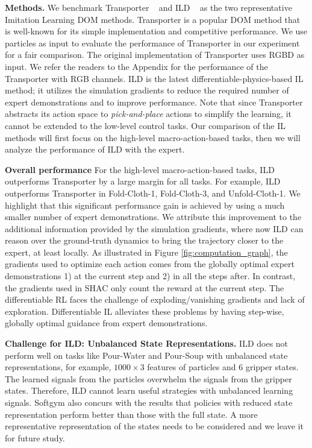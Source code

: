 

\textbf{Methods.}
We benchmark Transporter ~\citep{transporter} and ILD ~\citep{ILD} as the two representative Imitation Learning DOM methods. Transporter is a popular DOM method that is well-known for its simple implementation and competitive performance. We use particles as input to evaluate the performance of Transporter in our experiment for a fair comparison. The original implementation of Transporter uses RGBD as input. We refer the readers to the Appendix  for the performance of the Transporter with RGB channels. ILD is the latest differentiable-physics-based IL method; it utilizes the simulation gradients to reduce the required number of expert demonstrations and to improve performance. Note that since Transporter abstracts its action space to \textit{pick-and-place} actions to simplify the learning, it cannot be extended to the low-level control tasks. Our comparison of the IL methods will first focus on the high-level macro-action-based tasks, then we will analyze the performance of ILD with the expert.

\textbf{Overall performance} For the high-level macro-action-based tasks, ILD outperforms Transporter by a large margin for all tasks. For example, ILD outperforms Transporter in Fold-Cloth-1, Fold-Cloth-3, and Unfold-Cloth-1. We highlight that this significant performance gain is achieved by using a much smaller number of expert demonstrations. We attribute this improvement to the additional information provided by the simulation gradients, where now ILD can reason over the ground-truth dynamics to bring the trajectory closer to the expert, at least locally. As illustrated in Figure \ref{fig:computation_graph}, the gradients used to optimize each action comes from the globally optimal expert demonstrations 1) at the current step and 2) in all the steps after. In contrast, the gradients used in SHAC only count the reward at the current step. The differentiable RL faces the challenge of exploding/vanishing gradients and lack of exploration. Differentiable IL alleviates these problems by having step-wise, globally optimal guidance from expert demonstrations.

\textbf{Challenge for ILD: Unbalanced State Representations.} ILD does not perform well on tasks like Pour-Water and Pour-Soup with unbalanced state representations, for example, $1000 \times 3$ features of particles and 6 gripper states. The learned signals from the particles overwhelm the signals from the gripper states. Therefore, ILD cannot learn useful strategies with unbalanced learning signals. Softgym \citep{softgym} also concurs with the results that policies with reduced state representation perform better than those with the full state. A more representative representation of the states needs to be considered and we leave it for future study.


